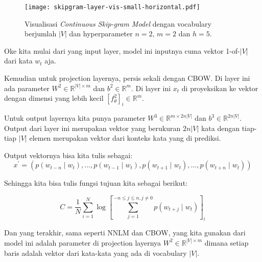 \documentclass[a4paper,12pt]{tufte-handout}
\newcommand{\R}{\mathbb{R}} %
\begin{document}
\begin{figure}
  \begin{center}
  \texttt{[image: skipgram-layer-vis-small-horizontal.pdf]}
  \end{center}
  \caption{
  Visualisasi \textit{Continuous Skip-gram Model} 
  dengan vocabulary berjumlah $|V|$ dan hyperparameter 
  $n=2$, $m=2$ dan $h=5$. 
  }
  \label{fig:skipgram-layer-vis}
\end{figure}

Oke kita mulai dari yang input layer, model ini inputnya cuma vektor
1-of-$|V|$ dari kata $w_{t}$ aja.

Kemudian untuk projection layernya, persis sekali dengan CBOW.
Di layer ini ada parameter $W^{2} \in \R^{|V|\times m}$ dan
$b^{2} \in \R^{m}$. Di layer ini $x_{t}$ di proyeksikan ke
vektor dengan dimensi yang lebih kecil 
$\left[ f_{\theta}^{2} \right]_{i} \in \R^{m}$.

Untuk output layernya kita punya parameter $W^{3} \in \R^{m \times 2n|V|}$
dan $b^{3} \in \R^{2n|V|}$. Output dari layer ini merupakan vektor yang
berukuran $2n|V|$ kata dengan tiap-tiap $|V|$ elemen merupakan vektor
dari konteks kata yang di prediksi.

Output vektornya bisa kita tulis sebagai:
$$
x^{'} = \left(
  p\left(w_{t-n} \mid w_{t}\right), \ldots,
  p\left(w_{t-1} \mid w_{t}\right),
  p\left(w_{t+1} \mid w_{t}\right), \ldots,
  p\left(w_{t+n} \mid w_{t}\right)
  \right)
$$

Sehingga kita bisa tulis fungsi tujuan kita sebagai berikut:

$$
C = \frac{1}{N}\sum_{i=1}^{N}\log{
  \left[
    \sum_{j=1}^{-n \leq j \leq n, j \neq 0}
    p(w_{t+j} \mid w_{t})
  \right]_{i}
}
$$

Dan yang terakhir, sama seperti NNLM dan CBOW, yang kita gunakan
dari model ini adalah parameter di projection layernya 
$W^{2} \in \R^{|V|\times m}$ dimana setiap baris adalah vektor
dari kata-kata yang ada di vocabulary $|V|$.

\end{document}
